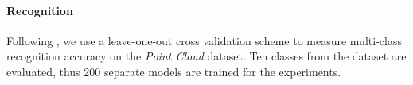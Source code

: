 \paragraph{Recognition}
Following \cite{Pham2011}, we use a leave-one-out cross validation scheme to measure multi-class recognition accuracy on the \emph{Point Cloud} dataset. 
Ten classes from the dataset are evaluated, thus 200 separate models are trained for the experiments.


